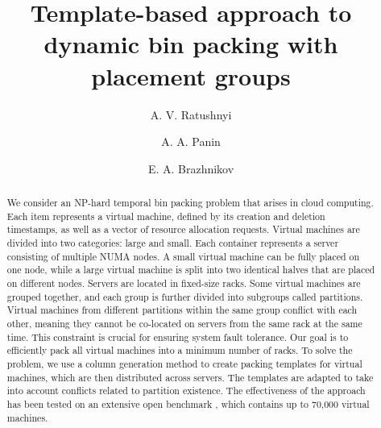 \begin{englishtitle} %
\title{
Template-based approach to dynamic bin packing with placement groups
}


\author{
A. V. Ratushnyi  \and A. A. Panin  \and E. A. Brazhnikov
}
\maketitle


\begin{abstract}

We consider an NP-hard temporal bin packing problem that arises in cloud computing.
Each item represents a virtual machine, defined by its creation and deletion timestamps, as well as a vector of resource allocation requests.
Virtual machines are divided into two categories: large and small.
Each container represents a server consisting of multiple NUMA nodes.
A small virtual machine can be fully placed on one node, while a large virtual machine is split into two identical halves that are placed on different nodes.
Servers are located in fixed-size racks.
Some virtual machines are grouped together, and each group is further divided into subgroups called partitions.
Virtual machines from different partitions within the same group conflict with each other, meaning they cannot be co-located on servers from the same rack at the same time.
This constraint is crucial for ensuring system fault tolerance.
Our goal is to efficiently pack all virtual machines into a minimum number of racks.
To solve the problem, we use a column generation method to create packing templates for virtual machines, which are then distributed across servers.
The templates are adapted to take into account conflicts related to partition existence.
The effectiveness of the approach has been tested on an extensive open benchmark \cite{benchmark}, which contains up to 70,000 virtual machines.

\end{abstract}
\end{englishtitle}



